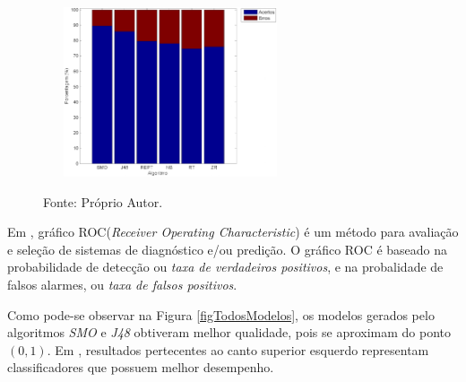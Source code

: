 \documentclass[
	12pt,				%
	openright,			%
	oneside,	
	a4paper,				%
	english,				%
	brazil				%
]{abntex2/abntex2} %
\begin{document}
\begin{figure}[!htb]
{			\includegraphics[width=07.5cm, height=05cm]{graphs/perc_hits_20k.png}}
		\begin{center}
		\end{center}
		{\fontsize{10}{\baselineskip} \selectfont Fonte: Próprio Autor.}
	\end{figure}
	
	\newpage

	
	Em \cite{prati:2008}, gráfico ROC(\textit{Receiver Operating Characteristic}) é um método para avaliação e seleção de sistemas de diagnóstico e/ou predição. O gráfico ROC é baseado na probabilidade de detecção ou \textit{taxa de verdadeiros positivos}, e na probalidade de falsos alarmes, ou \textit{taxa de falsos positivos}.
	
	Como pode-se observar na Figura \ref{figTodosModelos}, os modelos gerados pelo algoritmos \textit{SMO} e \textit{J48} obtiveram melhor qualidade, pois se aproximam do ponto $(0,1)$.  Em \cite{prati:2008}, resultados pertecentes ao canto superior esquerdo representam classificadores que possuem melhor desempenho.
	
\end{document}
